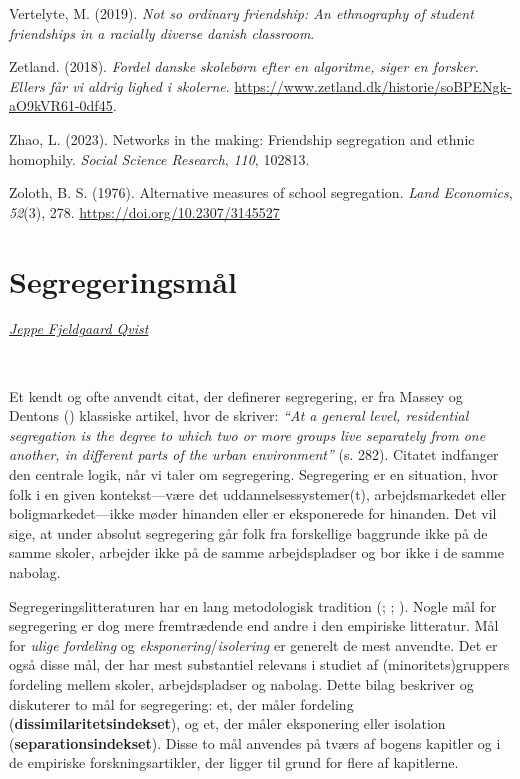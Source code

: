 \documentclass[
]{book}
\newlength{\cslhangindent}
\newenvironment{CSLReferences}[2] %
 {\begin{list}{}{%
  \setlength{\itemindent}{0pt}
  \setlength{\leftmargin}{0pt}
  \setlength{\parsep}{0pt}
  \ifodd #1
   \setlength{\leftmargin}{\cslhangindent}
   \setlength{\itemindent}{-1\cslhangindent}
  \fi
  \setlength{\itemsep}{#2\baselineskip}}}
 {\end{list}}
\begin{document}
\begin{CSLReferences}{1}{0}
Vertelyte, M. (2019). \emph{Not so ordinary friendship: An ethnography of student friendships in a racially diverse danish classroom}.

Zetland. (2018). \emph{Fordel danske skolebørn efter en algoritme, siger en forsker. Ellers får vi aldrig lighed i skolerne}. \url{https://www.zetland.dk/historie/soBPENgk-aO9kVR61-0df45}.

Zhao, L. (2023). Networks in the making: Friendship segregation and ethnic homophily. \emph{Social Science Research}, \emph{110}, 102813.

Zoloth, B. S. (1976). Alternative measures of school segregation. \emph{Land Economics}, \emph{52}(3), 278. \url{https://doi.org/10.2307/3145527}

\end{CSLReferences}

\appendix


\chapter{Segregeringsmål}\label{bilag1}

\emph{\href{https://vbn.aau.dk/da/persons/jeppefl}{Jeppe Fjeldgaard Qvist}}

~~~~

Et kendt og ofte anvendt citat, der definerer segregering, er fra Massey og Dentons () klassiske artikel, hvor de skriver: \emph{``At a general level, residential segregation is the degree to which two or more groups live separately from one another, in different parts of the urban environment''} (s. 282). Citatet indfanger den centrale logik, når vi taler om segregering. Segregering er en situation, hvor folk i en given kontekst---være det uddannelsessystemer(t), arbejdsmarkedet eller boligmarkedet---ikke møder hinanden eller er eksponerede for hinanden. Det vil sige, at under absolut segregering går folk fra forskellige baggrunde ikke på de samme skoler, arbejder ikke på de samme arbejdspladser og bor ikke i de samme nabolag.

Segregeringslitteraturen har en lang metodologisk tradition (; ; ). Nogle mål for segregering er dog mere fremtrædende end andre i den empiriske litteratur. Mål for \emph{ulige fordeling} og \emph{eksponering}/\emph{isolering} er generelt de mest anvendte. Det er også disse mål, der har mest substantiel relevans i studiet af (minoritets)gruppers fordeling mellem skoler, arbejdspladser og nabolag. Dette bilag beskriver og diskuterer to mål for segregering: et, der måler fordeling (\textbf{dissimilaritetsindekset}), og et, der måler eksponering eller isolation (\textbf{separationsindekset}). Disse to mål anvendes på tværs af bogens kapitler og i de empiriske forskningsartikler, der ligger til grund for flere af kapitlerne.
\end{document}
